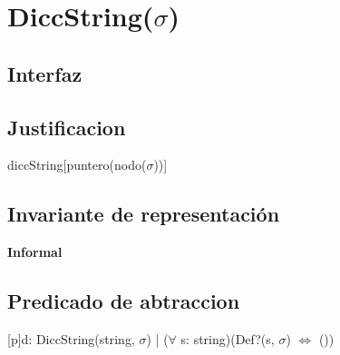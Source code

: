 \section{DiccString($\sigma$)}

\subsection{Interfaz}

\begin{Representacion}
\subsection{Justificacion}
	\begin{Estructura}{diccString}[puntero(nodo($\sigma$))]
		\begin{Tupla}[nodo]
		\end{Tupla}
	\end{Estructura}
\subsection{Invariante de representación}

\textbf{Informal}


\subsection{Predicado de abtraccion}

[p]{d: DiccString(string, $\sigma$) | ($\forall$ s: string)(Def?(s, $\sigma$) $\Leftrightarrow$ ())}

\end{Representacion}